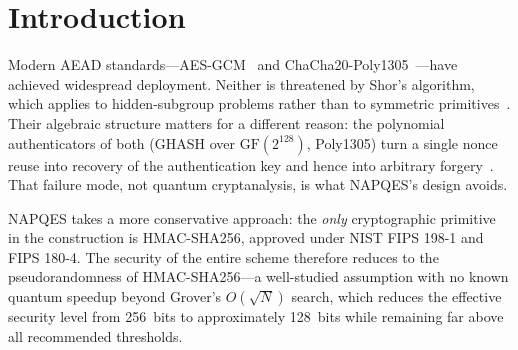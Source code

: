 \documentclass[11pt,a4paper]{article}
\begin{document}
\section{Introduction}
\label{sec:intro}

Modern AEAD standards—AES-GCM~\cite{nist-gcm} and
ChaCha20-Poly1305~\cite{rfc8439}—have achieved widespread deployment.
Neither is threatened by Shor's algorithm, which applies to hidden-subgroup
problems rather than to symmetric primitives~\cite{nistpq2022}. Their
algebraic structure matters for a different reason: the polynomial
authenticators of both (GHASH over $\mathrm{GF}(2^{128})$, Poly1305) turn a
single nonce reuse into recovery of the authentication key and hence into
arbitrary forgery~\cite{joux2006}. That failure mode, not quantum
cryptanalysis, is what NAPQES's design avoids.

NAPQES takes a more conservative approach: the \emph{only} cryptographic
primitive in the construction is HMAC-SHA256, approved under NIST FIPS
198-1 and FIPS 180-4. The security of the entire scheme therefore reduces
to the pseudorandomness of HMAC-SHA256—a well-studied assumption with no
known quantum speedup beyond Grover's $O(\sqrt{N})$ search, which reduces
the effective security level from 256~bits to approximately 128~bits while
remaining far above all recommended thresholds.
\end{document}
